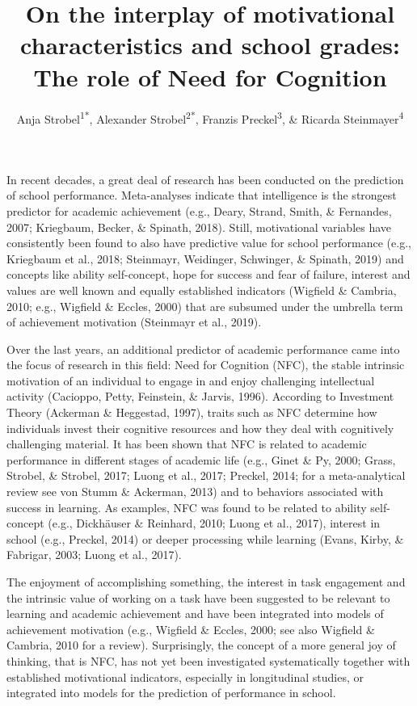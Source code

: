 \documentclass[
  man]{apa6}
\title{On the interplay of motivational characteristics and school grades: The role of Need for Cognition}
\author{Anja Strobel\textsuperscript{1*}, Alexander Strobel\textsuperscript{2*}, Franzis Preckel\textsuperscript{3}, \& Ricarda Steinmayer\textsuperscript{4}}
\date{}
\affiliation{\vspace{0.5cm}\textsuperscript{1} Department of Psychology, Chemnitz University of Technology, Chemnitz, Germany\\\textsuperscript{2} Faculty of Psychology, Technische Universität Dresden, Dresden, Germany\\\textsuperscript{3} Department of Psychology, University of Trier, Trier, Germany\\\textsuperscript{4} Department of Psychology, TU Dortmund University, Dortmund, Germany}
\begin{document}
\maketitle

In recent decades, a great deal of research has been conducted on the prediction of school performance. Meta-analyses indicate that intelligence is the strongest predictor for academic achievement (e.g., Deary, Strand, Smith, \& Fernandes, 2007; Kriegbaum, Becker, \& Spinath, 2018). Still, motivational variables have consistently been found to also have predictive value for school performance (e.g., Kriegbaum et al., 2018; Steinmayr, Weidinger, Schwinger, \& Spinath, 2019) and concepts like ability self-concept, hope for success and fear of failure, interest and values are well known and equally established indicators (Wigfield \& Cambria, 2010; e.g., Wigfield \& Eccles, 2000) that are subsumed under the umbrella term of achievement motivation (Steinmayr et al., 2019).

Over the last years, an additional predictor of academic performance came into the focus of research in this field: Need for Cognition (NFC), the stable intrinsic motivation of an individual to engage in and enjoy challenging intellectual activity (Cacioppo, Petty, Feinstein, \& Jarvis, 1996). According to Investment Theory (Ackerman \& Heggestad, 1997), traits such as NFC determine how individuals invest their cognitive resources and how they deal with cognitively challenging material. It has been shown that NFC is related to academic performance in different stages of academic life (e.g., Ginet \& Py, 2000; Grass, Strobel, \& Strobel, 2017; Luong et al., 2017; Preckel, 2014; for a meta-analytical review see von Stumm \& Ackerman, 2013) and to behaviors associated with success in learning. As examples, NFC was found to be related to ability self-concept (e.g., Dickhäuser \& Reinhard, 2010; Luong et al., 2017), interest in school (e.g., Preckel, 2014) or deeper processing while learning (Evans, Kirby, \& Fabrigar, 2003; Luong et al., 2017).

The enjoyment of accomplishing something, the interest in task engagement and the intrinsic value of working on a task have been suggested to be relevant to learning and academic achievement and have been integrated into models of achievement motivation (e.g., Wigfield \& Eccles, 2000; see also Wigfield \& Cambria, 2010 for a review). Surprisingly, the concept of a more general joy of thinking, that is NFC, has not yet been investigated systematically together with established motivational indicators, especially in longitudinal studies, or integrated into models for the prediction of performance in school.
\end{document}
